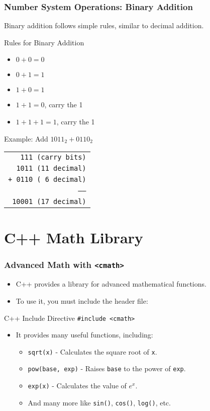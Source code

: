 \documentclass{beamer}
\begin{document}
\begin{frame}
\frametitle{Number System Operations: Binary Addition}
Binary addition follows simple rules, similar to decimal addition.

\begin{block}{Rules for Binary Addition}
\begin{itemize}
    \item $0 + 0 = 0$
    \item $0 + 1 = 1$
    \item $1 + 0 = 1$
    \item $1 + 1 = 0$, carry the 1
    \item $1 + 1 + 1 = 1$, carry the 1
\end{itemize}
\end{block}

\begin{exampleblock}{Example: Add $1011_2 + 0110_2$}
\begin{center}
\begin{tabular}{r}
\texttt{  111  (carry bits)} \\
\texttt{  1011 (11 decimal)} \\
\texttt{+ 0110 ( 6 decimal)} \\
\texttt{------} \\
\texttt{ 10001 (17 decimal)}
\end{tabular}
\end{center}
\end{exampleblock}
\end{frame}

\section{C++ Math Library}

\begin{frame}
\frametitle{Advanced Math with \texttt{<cmath>}}
\begin{itemize}
    \item C++ provides a library for advanced mathematical functions.
    \item To use it, you must include the header file:
\end{itemize}
\begin{block}{C++ Include Directive}
\texttt{\#include <cmath>}
\end{block}
\begin{itemize}
    \item It provides many useful functions, including:
    \begin{itemize}
        \item \texttt{sqrt(x)} - Calculates the square root of \texttt{x}.
        \item \texttt{pow(base, exp)} - Raises \texttt{base} to the power of \texttt{exp}.
        \item \texttt{exp(x)} - Calculates the value of $e^x$.
        \item And many more like \texttt{sin()}, \texttt{cos()}, \texttt{log()}, etc.
    \end{itemize}
\end{itemize}
\end{frame}
\end{document}
